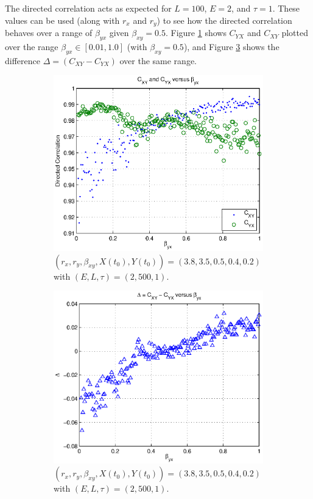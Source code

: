\documentclass[a4paper,11pt]{article}
\begin{document}
The directed correlation acts as expected for $L=100$, $E=2$, and $\tau=1$.  These values can be used (along with $r_x$ and $r_y$) to see how the directed correlation behaves over a range of $\beta_{yx}$ given $\beta_{xy}=0.5$.  Figure \ref{fig:CxyCyxVByx_raw} shows $C_{YX}$ and $C_{XY}$ plotted over the range $\beta_{yx}\in[0.01,1.0]$ (with $\beta_{xy}=0.5$), and Figure \ref{fig:CxyCyxVByx_diff} shows the difference $\Delta = (C_{XY}-C_{YX})$ over the same range.
\begin{figure}[h!t]
\centering
\begin{subfigure}[b]{0.4\textwidth}
\label{fig:CxyCyxVByx_raw}
\includegraphics[scale=0.55]{graphics/CxyCyxVByx_raw.eps}
\caption{$\left(r_x,r_y,\beta_{xy},X(t_0),Y(t_0)\right) = \left(3.8,3.5,0.5,0.4,0.2\right)$ with $\left(E,L,\tau\right)=\left(2,500,1\right)$.}
\end{subfigure}
\begin{subfigure}[b]{0.4\textwidth}
\label{fig:CxyCyxVByx_diff}
\includegraphics[scale=0.55]{graphics/CxyCyxVByx_diff.eps}
\caption{$\left(r_x,r_y,\beta_{xy},X(t_0),Y(t_0)\right) = \left(3.8,3.5,0.5,0.4,0.2\right)$ with $\left(E,L,\tau\right)=\left(2,500,1\right)$.}
\end{subfigure}
\caption{}
\end{figure}
\end{document}
